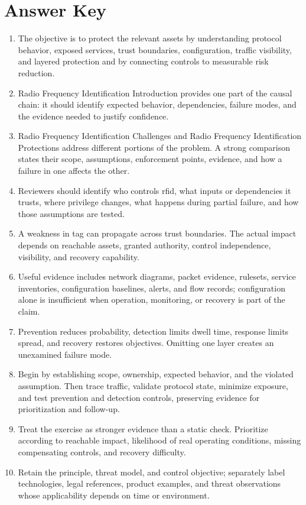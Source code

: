 \documentclass[11pt,letterpaper]{article}
\begin{document}
\section*{Answer Key}
\begin{enumerate}
\item The objective is to protect the relevant assets by understanding protocol behavior, exposed services, trust boundaries, configuration, traffic visibility, and layered protection and by connecting controls to measurable risk reduction.
\item Radio Frequency Identification Introduction provides one part of the causal chain: it should identify expected behavior, dependencies, failure modes, and the evidence needed to justify confidence.
\item Radio Frequency Identification Challenges and Radio Frequency Identification Protections address different portions of the problem. A strong comparison states their scope, assumptions, enforcement points, evidence, and how a failure in one affects the other.
\item Reviewers should identify who controls rfid, what inputs or dependencies it trusts, where privilege changes, what happens during partial failure, and how those assumptions are tested.
\item A weakness in tag can propagate across trust boundaries. The actual impact depends on reachable assets, granted authority, control independence, visibility, and recovery capability.
\item Useful evidence includes network diagrams, packet evidence, rulesets, service inventories, configuration baselines, alerts, and flow records; configuration alone is insufficient when operation, monitoring, or recovery is part of the claim.
\item Prevention reduces probability, detection limits dwell time, response limits spread, and recovery restores objectives. Omitting one layer creates an unexamined failure mode.
\item Begin by establishing scope, ownership, expected behavior, and the violated assumption. Then trace traffic, validate protocol state, minimize exposure, and test prevention and detection controls, preserving evidence for prioritization and follow-up.
\item Treat the exercise as stronger evidence than a static check. Prioritize according to reachable impact, likelihood of real operating conditions, missing compensating controls, and recovery difficulty.
\item Retain the principle, threat model, and control objective; separately label technologies, legal references, product examples, and threat observations whose applicability depends on time or environment.
\end{enumerate}
\end{document}
